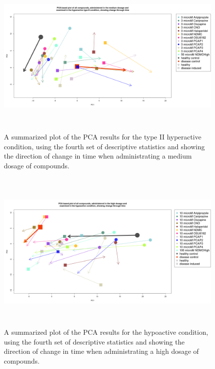 \documentclass[a4paper,12pt]{article}
\begin{document}
\newpage
\begin{figure}[h!]
\begin{center}
\includegraphics[width=16cm,height=8cm]{All_together_3_microM_DarkPTZ_in_time_set4.png}
\caption{A summarized plot of the PCA results for the type II hyperactive condition, using the fourth set of descriptive statistics and showing the direction of change in time when administrating a medium dosage of compounds.}
\end{center}
\end{figure}
\newpage
\begin{figure}[h!]
\begin{center}
\includegraphics[width=16cm,height=8cm]{All_together_10_microM_DarkApoLow_in_time_set4.png}
\caption{A summarized plot of the PCA results for the hypoactive condition, using the fourth set of descriptive statistics and showing the direction of change in time when administrating a high dosage of compounds.}
\end{center}
\end{figure}
\end{document}
